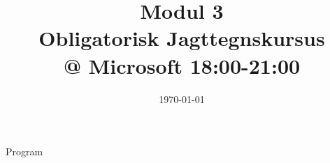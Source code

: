\documentclass[11pt,aspectratio=169]{beamer}
\title{Modul 3 \\
Obligatorisk Jagttegnskursus \\ @ Microsoft 18:00-21:00}
\date{\today}
\begin{document}
\begin{frame}
  \titlepage
\end{frame}

\begin{frame}{Program}
  \tableofcontents
\end{frame}








\end{document}
